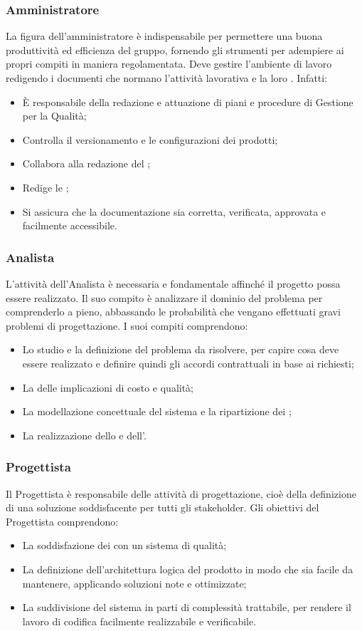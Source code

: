 \documentclass[NormeDiProgetto.tex]{subfiles}
\begin{document}
	\subsubsection{Amministratore}
	La figura dell'amministratore è indispensabile per permettere una buona produttività ed efficienza del gruppo, fornendo gli strumenti per adempiere ai propri compiti in maniera regolamentata. Deve gestire l'ambiente di lavoro redigendo i documenti che normano l'attività lavorativa e la loro . Infatti:
	\begin{itemize}
		\item È responsabile della redazione e attuazione di piani e procedure di Gestione per la Qualità;
		\item Controlla il versionamento e le configurazioni dei prodotti;
		\item Collabora alla redazione del \pdp;
		\item Redige le \ndp;
		\item Si assicura che la documentazione sia corretta, verificata, approvata e facilmente accessibile.
	\end{itemize}

	\subsubsection{Analista}
	L'attività dell'Analista è necessaria e fondamentale affinché il progetto possa essere realizzato. Il suo compito è analizzare il dominio del problema per comprenderlo a pieno, abbassando le probabilità che vengano effettuati gravi problemi di progettazione. I suoi compiti comprendono:
	\begin{itemize}
		\item Lo studio e la definizione del problema da risolvere, per capire cosa deve essere realizzato e definire quindi gli accordi contrattuali in base ai  richiesti;
		\item La  delle implicazioni di costo e qualità;
		\item La modellazione concettuale del sistema e la ripartizione dei ;
		\item La realizzazione dello \sdf e dell'\adr.
	\end{itemize}
	\subsubsection{Progettista}
	Il Progettista è responsabile delle attività di progettazione, cioè della definizione di una soluzione soddisfacente per tutti gli stakeholder. Gli obiettivi del Progettista comprendono:
	\begin{itemize}
		\item La soddisfazione dei  con un sistema di qualità;
		\item La definizione dell'architettura logica del prodotto in modo che sia facile da mantenere, applicando soluzioni note e ottimizzate;
		\item La suddivisione del sistema in parti di complessità trattabile, per rendere il lavoro di codifica facilmente realizzabile e verificabile.
	\end{itemize} 
\end{document}
